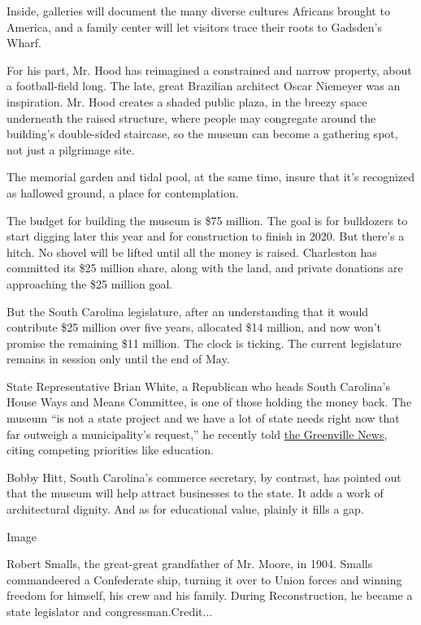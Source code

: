 Inside, galleries will document the many diverse cultures Africans
brought to America, and a family center will let visitors trace their
roots to Gadsden's Wharf.

For his part, Mr. Hood has reimagined a constrained and narrow property,
about a football-field long. The late, great Brazilian architect Oscar
Niemeyer was an inspiration. Mr. Hood creates a shaded public plaza, in
the breezy space underneath the raised structure, where people may
congregate around the building's double-sided staircase, so the museum
can become a gathering spot, not just a pilgrimage site.

The memorial garden and tidal pool, at the same time, insure that it's
recognized as hallowed ground, a place for contemplation.

The budget for building the museum is \$75 million. The goal is for
bulldozers to start digging later this year and for construction to
finish in 2020. But there's a hitch. No shovel will be lifted until all
the money is raised. Charleston has committed its \$25 million share,
along with the land, and private donations are approaching the \$25
million goal.

But the South Carolina legislature, after an understanding that it would
contribute \$25 million over five years, allocated \$14 million, and now
won't promise the remaining \$11 million. The clock is ticking. The
current legislature remains in session only until the end of May.

State Representative Brian White, a Republican who heads South
Carolina's House Ways and Means Committee, is one of those holding the
money back. The museum ``is not a state project and we have a lot of
state needs right now that far outweigh a municipality's request,'' he
recently told
\href{https://www.greenvilleonline.com/story/news/2018/03/08/former-charleston-mayors-museum-mission-cant-rest-until-ive-done-my-duty/340719002/}{the
Greenville News}, citing competing priorities like education.

Bobby Hitt, South Carolina's commerce secretary, by contrast, has
pointed out that the museum will help attract businesses to the state.
It adds a work of architectural dignity. And as for educational value,
plainly it fills a gap.

Image

Robert Smalls, the great-great grandfather of Mr. Moore, in 1904. Smalls
commandeered a Confederate ship, turning it over to Union forces and
winning freedom for himself, his crew and his family. During
Reconstruction, he became a state legislator and congressman.Credit...

